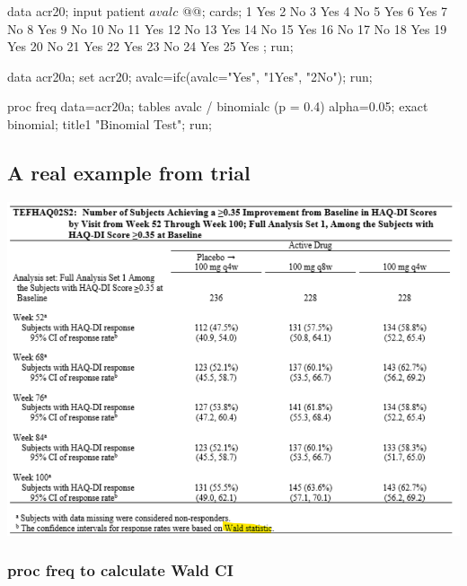 \documentclass[
]{book}
\newenvironment{Shaded}{\begin{snugshade}}{\end{snugshade}}
\newcommand{\BaseNTok}[1]{\textcolor[rgb]{0.00,0.00,0.81}{#1}}
\newcommand{\NormalTok}[1]{#1}
\begin{document}
\begin{Shaded}
\begin{Highlighting}[]
\NormalTok{data acr20;}
\BaseNTok{    input patient $ avalc $ @@;}
\BaseNTok{    cards;}
\BaseNTok{    1 Yes 2 No}
\BaseNTok{    3 Yes 4 No}
\BaseNTok{    5 Yes 6 Yes}
\BaseNTok{    7 No  8 Yes}
\BaseNTok{    9 No  10 No}
\BaseNTok{    11 Yes 12 No}
\BaseNTok{    13 Yes 14 No}
\BaseNTok{    15 Yes 16 No}
\BaseNTok{    17 No  18 Yes}
\BaseNTok{    19 Yes 20 No}
\BaseNTok{    21 Yes 22 Yes}
\BaseNTok{    23 No 24 Yes}
\BaseNTok{    25 Yes}
\BaseNTok{    ;}
\NormalTok{run;}

\NormalTok{data acr20a;}
\BaseNTok{    set acr20;}
\BaseNTok{    avalc=ifc(avalc="Yes", "1Yes", "2No");}
\NormalTok{run;}

\NormalTok{proc freq data=acr20a;}
\BaseNTok{    tables avalc / binomialc (p = 0.4) alpha=0.05;}
\BaseNTok{    exact binomial;}
\BaseNTok{    title1 "Binomial Test";}
\NormalTok{run;}
\end{Highlighting}
\end{Shaded}

\hypertarget{a-real-example-from-trial}{%
\subsection{A real example from trial}\label{a-real-example-from-trial}}

\includegraphics[width=13.01in]{images/wald_ci}

\hypertarget{proc-freq-to-calculate-wald-ci}{%
\subsubsection{proc freq to calculate Wald CI}\label{proc-freq-to-calculate-wald-ci}}
\end{document}
